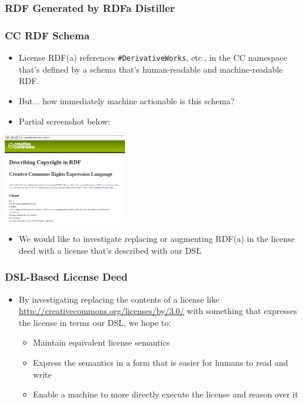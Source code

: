 \documentclass[mathserif,xcolor=dvipsnames,hyperref={bookmarks=true}]{beamer}
\begin{document}
\begin{frame}[fragile]
\frametitle{RDF Generated by RDFa Distiller}

\end{frame}

\begin{frame}[t]
\frametitle{CC RDF Schema}
        \begin{itemize}
            \item License RDF(a) references \texttt{\#DerivativeWorks}, etc., in the CC namespace that's defined by a schema that's human-readable and machine-readable RDF.
            \item But... how immediately machine actionable is this schema?
            \item Partial screenshot below:
        \end{itemize}
        \begin{center}
            \includegraphics[width=0.4\textwidth]{schema-screenshot-partial.png}
        \end{center}
        \begin{itemize}
            \item We would like to investigate replacing or augmenting RDF(a)
            in the license deed with a license that's described with our DSL
        \end{itemize}
\end{frame}

\begin{frame}[t]
\frametitle{DSL-Based License Deed}
    \begin{itemize}
        \item By investigating replacing the contents of a license like
        \url{http://creativecommons.org/licenses/by/3.0/} with something that
        expresses the license in terms our DSL, we hope to:
        \begin{itemize}
            \item Maintain equivalent license semantics
            \item Express the semantics in a form that is easier for humans to read and write
            \item Enable a machine to more directly execute the license and reason over it
        \end{itemize}
    \end{itemize}
\end{frame}
\end{document}
